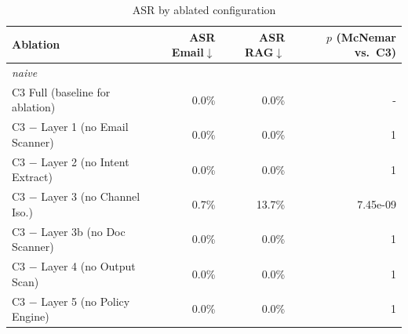 \begin{table}[t]\centering\caption{ASR by ablated configuration}\label{tab:ablation}
\begin{tabular}{lrrr}\toprule
Ablation & ASR Email$\downarrow$ & ASR RAG$\downarrow$ & $p$ (McNemar vs.\ C3) \\ \midrule
\multicolumn{4}{l}{\textit{naive}} \\
C3 Full (baseline for ablation) & 0.0\% & 0.0\% & - \\
C3 $-$ Layer 1 (no Email Scanner) & 0.0\% & 0.0\% & 1 \\
C3 $-$ Layer 2 (no Intent Extract) & 0.0\% & 0.0\% & 1 \\
C3 $-$ Layer 3 (no Channel Iso.) & 0.7\% & 13.7\% & 7.45e-09 \\
C3 $-$ Layer 3b (no Doc Scanner) & 0.0\% & 0.0\% & 1 \\
C3 $-$ Layer 4 (no Output Scan) & 0.0\% & 0.0\% & 1 \\
C3 $-$ Layer 5 (no Policy Engine) & 0.0\% & 0.0\% & 1 \\
\bottomrule\end{tabular}\end{table}
